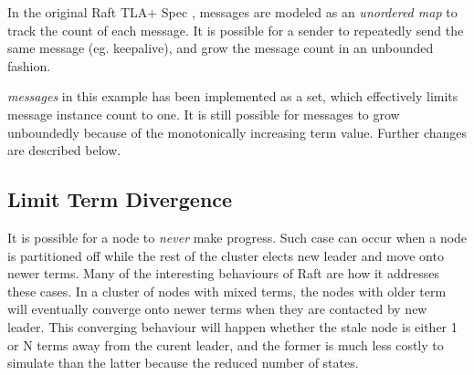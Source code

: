 In the original Raft TLA+ Spec \cite{raft_tla}, messages are modeled as an
\textit{unordered map} to track the count of each message. It is possible for a
sender to repeatedly send the same message (eg. keepalive), and grow the 
message count in an unbounded fashion.\newline

\textit{messages} in this example has been implemented as a set, which
effectively limits message instance count to one. It is still possible for
messages to grow unboundedly because of the monotonically increasing term value.
Further changes are described below.

\subsection{Limit Term Divergence} 

It is possible for a node to \textit{never} make progress. Such case can occur
when a node is partitioned off while the rest of the cluster elects new leader
and move onto newer terms. Many of the interesting behaviours of Raft are how it
addresses these cases. In a cluster of nodes with mixed terms, the nodes with
older term will eventually converge onto newer terms when they are contacted by
new leader. This converging behaviour will happen whether the stale node is
either 1 or N terms away from the curent leader, and the former is much less
costly to simulate than the latter because the reduced number of states.\newline

